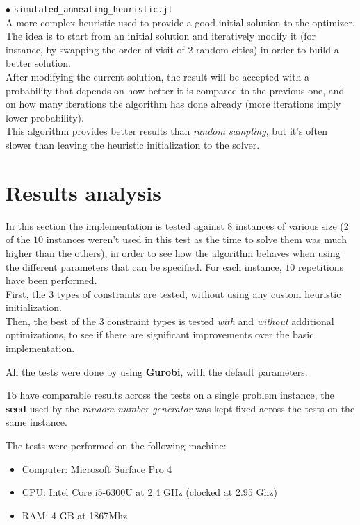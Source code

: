 \documentclass[
12pt,
a4paper,
oneside,
headinclude,
footinclude]{article}
\begin{document}
    
    $\bullet$ \texttt{simulated\_annealing\_heuristic.jl}\\
    A more complex heuristic used to provide a good initial solution to the optimizer.\\
    The idea is to start from an initial solution and iteratively modify it (for instance, by swapping the order of visit of $2$ random cities) in order to build a better solution.\\
    After modifying the current solution, the result will be accepted with a probability that depends on how better it is compared to the previous one, and on how many iterations the algorithm has done already (more iterations imply lower probability).\\
    This algorithm provides better results than \textit{random sampling}, but it's often slower than leaving the heuristic initialization to the solver. 
    
    \newpage 
    \section{Results analysis}
    In this section the implementation is tested against $8$ instances of various size ($2$ of the $10$ instances weren't used in this test as the time to solve them was much higher than the others), in order to see how the algorithm behaves when using the different parameters that can be specified. For each instance, $10$ repetitions have been performed. \\
    First, the $3$ types of constraints are tested, without using any custom heuristic initialization. \\
    Then, the best of the $3$ constraint types is tested \textit{with} and \textit{without} additional optimizations, to see if there are significant improvements over the basic implementation.
    
    All the tests were done by using \textbf{Gurobi}, with the default parameters.
    
    To have comparable results across the tests on a single problem instance, the \textbf{seed} used by the \textit{random number generator} was kept fixed across the tests on the same instance.
    
    The tests were performed on the following machine:
    \begin{itemize}
        \item Computer: Microsoft Surface Pro 4
        \item CPU: Intel Core i5-6300U at 2.4 GHz (clocked at 2.95 Ghz)
        \item RAM: 4 GB at 1867Mhz
    \end{itemize}
\end{document}
